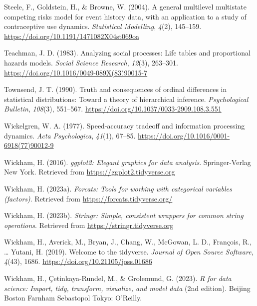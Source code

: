 \documentclass[
  man, donotrepeattitle,floatsintext]{apa6}
\newlength{\cslhangindent}
\newenvironment{CSLReferences}[2] %
 {\begin{list}{}{%
  \setlength{\itemindent}{0pt}
  \setlength{\leftmargin}{0pt}
  \setlength{\parsep}{0pt}
  \ifodd #1
   \setlength{\leftmargin}{\cslhangindent}
   \setlength{\itemindent}{-1\cslhangindent}
  \fi
  \setlength{\itemsep}{#2\baselineskip}}}
 {\end{list}}
\begin{document}
\begin{CSLReferences}{1}{0}
Steele, F., Goldstein, H., \& Browne, W. (2004). A general multilevel multistate competing risks model for event history data, with an application to a study of contraceptive use dynamics. \emph{Statistical Modelling}, \emph{4}(2), 145--159. \url{https://doi.org/10.1191/1471082X04st069oa}

Teachman, J. D. (1983). Analyzing social processes: {Life} tables and proportional hazards models. \emph{Social Science Research}, \emph{12}(3), 263--301. \url{https://doi.org/10.1016/0049-089X(83)90015-7}

Townsend, J. T. (1990). Truth and consequences of ordinal differences in statistical distributions: {Toward} a theory of hierarchical inference. \emph{Psychological Bulletin}, \emph{108}(3), 551--567. \url{https://doi.org/10.1037/0033-2909.108.3.551}

Wickelgren, W. A. (1977). Speed-accuracy tradeoff and information processing dynamics. \emph{Acta Psychologica}, \emph{41}(1), 67--85. \url{https://doi.org/10.1016/0001-6918(77)90012-9}

Wickham, H. (2016). \emph{ggplot2: Elegant graphics for data analysis}. Springer-Verlag New York. Retrieved from \url{https://ggplot2.tidyverse.org}

Wickham, H. (2023a). \emph{Forcats: Tools for working with categorical variables (factors)}. Retrieved from \url{https://forcats.tidyverse.org/}

Wickham, H. (2023b). \emph{Stringr: Simple, consistent wrappers for common string operations}. Retrieved from \url{https://stringr.tidyverse.org}

Wickham, H., Averick, M., Bryan, J., Chang, W., McGowan, L. D., François, R., \ldots{} Yutani, H. (2019). Welcome to the {tidyverse}. \emph{Journal of Open Source Software}, \emph{4}(43), 1686. \url{https://doi.org/10.21105/joss.01686}

Wickham, H., Çetinkaya-Rundel, M., \& Grolemund, G. (2023). \emph{R for data science: Import, tidy, transform, visualize, and model data} (2nd edition). Beijing Boston Farnham Sebastopol Tokyo: O'Reilly.


\end{CSLReferences}
\end{document}
